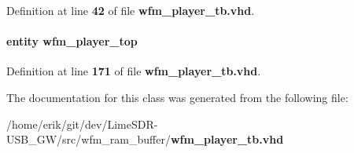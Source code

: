 Definition at line {\bf 42} of file {\bf wfm\+\_\+player\+\_\+tb.\+vhd}.

\paragraph[{wfm\+\_\+player\+\_\+top\+\_\+inst}]{ {\bfseries \textcolor{keywordflow}{entity}\textcolor{vhdlchar}{ }\textcolor{vhdlchar}{wfm\+\_\+player\+\_\+top}\textcolor{vhdlchar}{ }} \hspace{0.3cm}{\ttfamily [Instantiation]}}\label{classwfm__player__tb_1_1tb__behave_a9bdba80f01b27f6486bb3b8df3b1fa29}


Definition at line {\bf 171} of file {\bf wfm\+\_\+player\+\_\+tb.\+vhd}.



The documentation for this class was generated from the following file\+:\begin{DoxyCompactItemize}
\item 
/home/erik/git/dev/\+Lime\+S\+D\+R-\/\+U\+S\+B\+\_\+\+G\+W/src/wfm\+\_\+ram\+\_\+buffer/{\bf wfm\+\_\+player\+\_\+tb.\+vhd}\end{DoxyCompactItemize}
